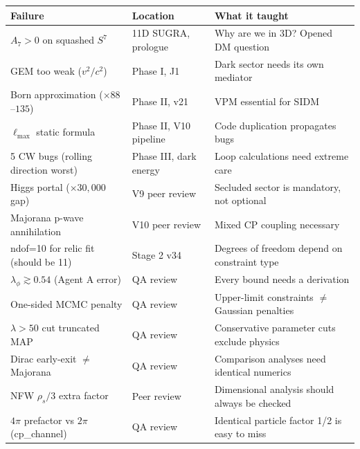 \documentclass[12pt, a4paper]{article}
\begin{document}
\begin{center}
\begin{longtable}{p{5cm}p{4cm}p{5cm}}
  \toprule
  Failure & Location & What it taught \\
  \midrule
  $A_7 > 0$ on squashed $S^7$ & 11D SUGRA, prologue & Why are we in 3D? Opened DM question \\
  GEM too weak ($v^2/c^2$) & Phase I, J1 & Dark sector needs its own mediator \\
  Born approximation ($\times 88$--$135$) & Phase II, v21 & VPM essential for SIDM \\
  $\ell_\text{max}$ static formula & Phase II, V10 pipeline & Code duplication propagates bugs \\
  5 CW bugs (rolling direction worst) & Phase III, dark energy & Loop calculations need extreme care \\
  Higgs portal ($\times 30{,}000$ gap) & V9 peer review & Secluded sector is mandatory, not optional \\
  Majorana p-wave annihilation & V10 peer review & Mixed CP coupling necessary \\
  ndof=10 for relic fit (should be 11) & Stage 2 v34 & Degrees of freedom depend on constraint type \\
  $\lambda_\phi \gtrsim 0.54$ (Agent A error) & QA review & Every bound needs a derivation \\
  One-sided MCMC penalty & QA review & Upper-limit constraints $\neq$ Gaussian penalties \\
  $\lambda > 50$ cut truncated MAP & QA review & Conservative parameter cuts exclude physics \\
  Dirac early-exit $\neq$ Majorana & QA review & Comparison analyses need identical numerics \\
  NFW $\rho_s/3$ extra factor & Peer review & Dimensional analysis should always be checked \\
  $4\pi$ prefactor vs $2\pi$ (cp\_channel) & QA review & Identical particle factor 1/2 is easy to miss \\
  \bottomrule
\end{longtable}
\end{center}
\end{document}
